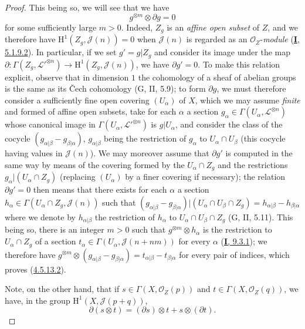 \begin{proof}
This being so, we will see that we have
\begin{equation}
\label{II.4.5.13.2}
  g^{\otimes m}\otimes\partial g=0
\tag{4.5.13.2}
\end{equation}
for some sufficiently large $m>0$. Indeed, $Z_g$ is an \emph{affine open subset} of $Z$, and
we therefore have $\mathrm{H}^1(Z_g,\mathcal{J}(n))=0$ when $\mathcal{J}(n)$ is
regarded as an $\mathcal{O}_Z$-\emph{module}
(\hyperref[I.5.1.9.2]{\textbf{I}, 5.1.9.2}). In particular, if we set
$g'=g|Z_g$ and consider its image under the map
$\partial:\Gamma(Z_g,\mathcal{L}'^{\otimes n})\to
\mathrm{H}^1(Z_g,\mathcal{J}(n))$, we have $\partial g'=0$. To make
this relation explicit, observe that in dimension $1$ the cohomology of a sheaf
of abelian groups is the same as its Čech cohomology (G, II, 5.9);
to form $\partial g$, we must therefore consider a sufficiently fine open covering
$(U_\alpha)$ of $X$, which we may assume \emph{finite} and formed
of affine open subsets, take for each $\alpha$ a section
$g_\alpha\in\Gamma(U_\alpha,\mathcal{L}^{\otimes n})$ whose canonical
image in $\Gamma(U_\alpha,\mathcal{L}'^{\otimes n})$ is
$g|U_\alpha$, and consider the class of the cocycle
$(g_{\alpha|\beta}-g_{\beta|\alpha})$, $g_{\alpha|\beta}$ being the
restriction of $g_\alpha$ to $U_\alpha\cap U_\beta$ (this cocycle having
values in $\mathcal{J}(n)$). We may moreover assume that $\partial g'$
is computed in the same way by means of the covering formed by the
$U_\alpha\cap Z_g$ and the restrictions $g_\alpha|(U_\alpha\cap Z_g)$
(replacing $(U_\alpha)$ by a finer covering if necessary); the
relation $\partial g'=0$ then means that there exists for each $\alpha$
a section $h_\alpha\in\Gamma(U_\alpha\cap Z_g,\mathcal{J}(n))$ such that $(g_{\alpha|\beta}-g_{\beta|\alpha})
|(U_\alpha\cap U_\beta\cap Z_g)
=h_{\alpha|\beta}-h_{\beta|\alpha}$
where we denote by $h_{\alpha|\beta}$ the restriction of $h_\alpha$ to
$U_\alpha\cap U_\beta\cap Z_g$ (G, II, 5.11). This being so, there is an integer
$m>0$ such that $g^{\otimes m}\otimes h_\alpha$ is the restriction to
$U_\alpha\cap Z_g$ of a section
$t_\alpha\in\Gamma(U_\alpha,\mathcal{J}(n+nm))$ for every $\alpha$
(\hyperref[I.9.3.1]{\textbf{I}, 9.3.1}); we therefore have $g^{\otimes m}\otimes(g_{\alpha|\beta}-g_{\beta|\alpha})
=t_{\alpha|\beta}-t_{\beta|\alpha}$
for every pair of indices, which proves
(\hyperref[II.4.5.13.2]{4.5.13.2}).

Note, on the other hand, that if
$s\in\Gamma(X,\mathcal{O}_Z(p))$ and
$t\in\Gamma(X,\mathcal{O}_Z(q))$, we have, in the group
$\mathrm{H}^1(X,\mathcal{J}(p+q))$,
\begin{equation}
\label{II.4.5.13.3}
  \partial(s\otimes t)=(\partial s)\otimes t+s\otimes(\partial t).
\tag{4.5.13.3}
\end{equation}


\end{proof}
